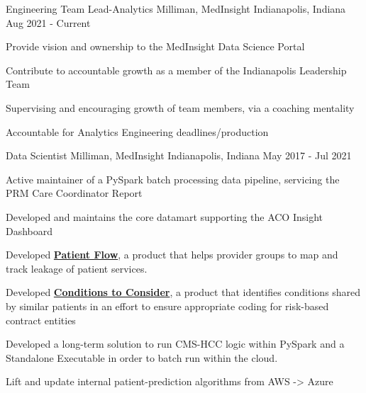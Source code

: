 

\begin{cventries}

  \cventry
    {Engineering Team Lead-Analytics} %
    {Milliman, MedInsight} %
    {Indianapolis, Indiana} %
    {Aug 2021 - Current} %
    {
      \begin{cvitems} %
        \item {Provide vision and ownership to the MedInsight Data Science Portal}
	\item {Contribute to accountable growth as a member of the Indianapolis Leadership Team}
        \item {Supervising and encouraging growth of team members, via a coaching mentality}
	\item {Accountable for Analytics Engineering deadlines/production}
      \end{cvitems}
    }

  \cventry
    {Data Scientist} %
    {Milliman, MedInsight} %
    {Indianapolis, Indiana} %
    {May 2017 - Jul 2021} %
    {
      \begin{cvitems} %
        \item {Active maintainer of a PySpark batch processing data pipeline, servicing the PRM Care Coordinator Report}
        \item {Developed and maintains the core datamart supporting the ACO Insight Dashboard}
        \item {Developed \href{http://www.medinsight.milliman.com/uploadedFiles/MedInsight_Site/About/MedInsight-Patient-Flow.pdf}{\textbf{Patient Flow}}, a product that helps provider groups to map and track leakage of patient services.}
	\item {Developed \href{http://assets.milliman.com/ektron/medinsight-machine-learning-conditions-consider.pdf}{\textbf{Conditions to Consider}}, a product that identifies conditions shared by similar patients in an effort to ensure appropriate coding for risk-based contract entities}
	\item {Developed a long-term solution to run CMS-HCC logic within PySpark and a Standalone Executable in order to batch run within the cloud.}
	\item {Lift and update internal patient-prediction algorithms from AWS -> Azure}
      \end{cvitems}
    }


\end{cventries}

